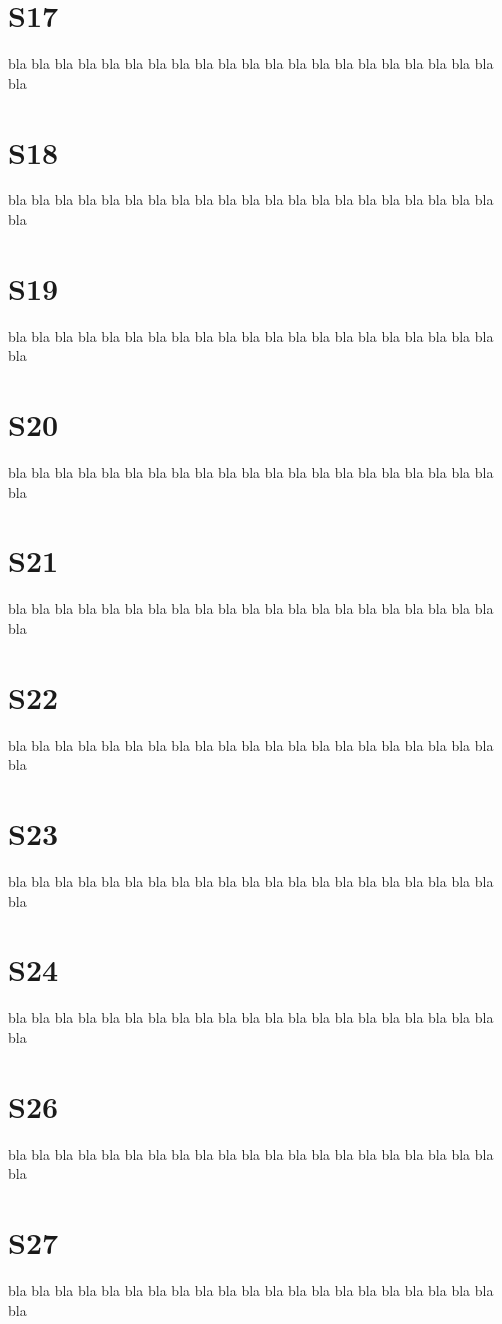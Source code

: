\documentclass[12pt,a4paper]{book}
\begin{document}
\section{S17}
bla bla bla bla bla bla bla bla bla bla bla
bla bla bla bla bla bla bla bla bla bla bla
\section{S18}
bla bla bla bla bla bla bla bla bla bla bla
bla bla bla bla bla bla bla bla bla bla bla
\section{S19}
bla bla bla bla bla bla bla bla bla bla bla
bla bla bla bla bla bla bla bla bla bla bla
\section{S20}
bla bla bla bla bla bla bla bla bla bla bla
bla bla bla bla bla bla bla bla bla bla bla
\section{S21}
bla bla bla bla bla bla bla bla bla bla bla
bla bla bla bla bla bla bla bla bla bla bla
\section{S22}
bla bla bla bla bla bla bla bla bla bla bla
bla bla bla bla bla bla bla bla bla bla bla
\section{S23}
bla bla bla bla bla bla bla bla bla bla bla
bla bla bla bla bla bla bla bla bla bla bla
\section{S24}
bla bla bla bla bla bla bla bla bla bla bla
bla bla bla bla bla bla bla bla bla bla bla
\section{S26}
bla bla bla bla bla bla bla bla bla bla bla
bla bla bla bla bla bla bla bla bla bla bla
\section{S27}
bla bla bla bla bla bla bla bla bla bla bla
bla bla bla bla bla bla bla bla bla bla bla
\end{document}
